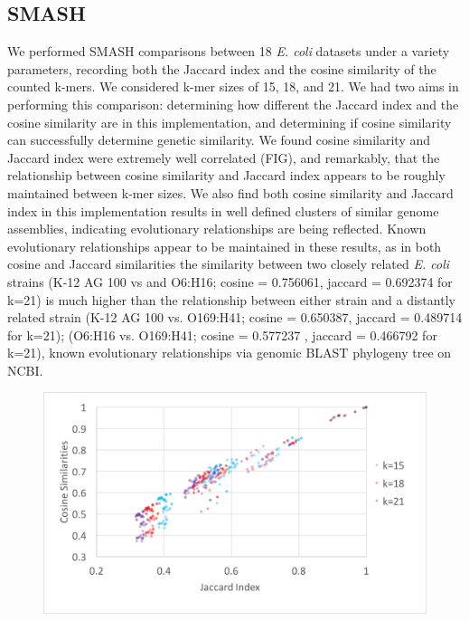 \documentclass[12pt, letterpaper]{article}
\begin{document}
\subsection{SMASH}
We performed SMASH comparisons between 18 \textit{E. coli} datasets under a variety parameters, recording both the Jaccard index and the cosine similarity of the counted k-mers. We considered k-mer sizes of 15, 18, and 21. We had two aims in performing this comparison: determining how different the Jaccard index and the cosine similarity are in this implementation, and determining if cosine similarity can successfully determine genetic similarity. We found cosine similarity and Jaccard index were extremely well correlated (FIG), and remarkably, that the relationship between cosine similarity and Jaccard index appears to be roughly maintained between k-mer sizes. We also find both cosine similarity and Jaccard index in this implementation results in well defined clusters of similar genome assemblies, indicating evolutionary relationships are being reflected. Known evolutionary relationships appear to be maintained in these results, as in both cosine and Jaccard similarities the similarity between two closely related \textit{E. coli} strains (K-12 AG 100 vs and O6:H16; cosine = 0.756061, jaccard = 0.692374 for k=21) is much higher than the relationship between either strain and a distantly related strain (K-12 AG 100 vs. O169:H41; cosine = 0.650387, jaccard = 0.489714 for k=21); (O6:H16 vs. O169:H41; cosine = 0.577237 , jaccard = 0.466792 for k=21), known evolutionary relationships via genomic BLAST phylogeny tree on NCBI.
\FloatBarrier
\begin{figure}[h]
	\centering
	\includegraphics[width=1.0\textwidth]{smashchart.png}
\end{figure}
\end{document}
